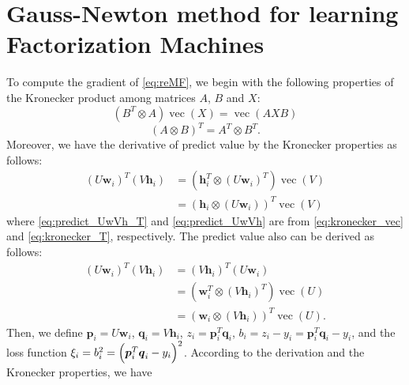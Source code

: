 \documentclass[11pt,twoside]{article}
\newcommand{\bsym}[1]{\ensuremath{\boldsymbol{#1}}}
\newcommand{\bw}{\ensuremath{\bsym{w}}}
\newcommand{\bj}{\ensuremath{\bsym{j}}}
\newcommand{\bp}{\ensuremath{\bsym{p}}}
\newcommand{\bq}{\ensuremath{\bsym{q}}}
\newcommand{\bh}{\ensuremath{\bsym{h}}}
\DeclareMathOperator*{\vectorize}{vec}
\begin{document}
\section{Gauss-Newton method for learning Factorization Machines}

To compute the gradient of \eqref{eq:reMF}, we begin with the following properties of  the Kronecker product among matrices $A$, $B$ and $X$:
\begin{equation}
(B^T \otimes A)\vectorize(X) = \vectorize(AXB)
\label{eq:kronecker_vec}
\end{equation}
\begin{equation}
(A \otimes B)^T = A^T \otimes B^T
\label{eq:kronecker_T}.
\end{equation}
Moreover, we have the derivative of predict value by the Kronecker properties as follows:
\begin{align}
(U \bw_i)^T (V \bh_i) &= (\bh_i^T \otimes (U \bw_i)^T)\vectorize(V)\label{eq:predict_UwVh_T} \\
&= (\bh_i \otimes (U \bw_i))^T\vectorize(V)
\label{eq:predict_UwVh}
\end{align}
where \eqref{eq:predict_UwVh_T} and \eqref{eq:predict_UwVh} are from \eqref{eq:kronecker_vec} and \eqref{eq:kronecker_T}, respectively.
The predict value also can be derived as follows:
\begin{align}
(U \bw_i)^T (V \bh_i) &= (V \bh_i)^T (U \bw_i) \nonumber \\
&= (\bw_i^T \otimes (V \bh_i)^T)\vectorize(U)\nonumber \\
&= (\bw_i \otimes (V \bh_i))^T \vectorize(U)
\label{eq:predict_VhUw}.
\end{align}
Then, we define $\bp_i = U\bw_i$, $\bq_i = V\bh_i$, $z_i = \bp_i^T\bq_i$, $b_i = z_i-y_i = \bp_i^T\bq_i-y_i$, and the loss function $\xi_i = b_i^2 = \Bigl(\bp_i^T\bq_i-y_i\Bigr)^2$.
According to the derivation and the Kronecker properties, we have
\end{document}
